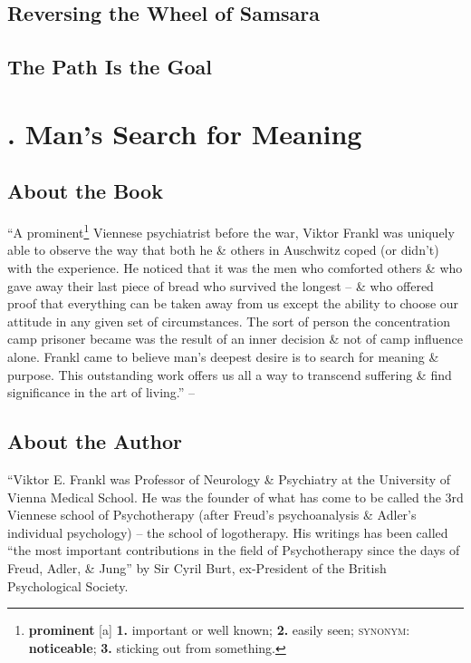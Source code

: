 \documentclass[oneside]{book}
\numberwithin{equation}{section}
\begin{document}

\section{Reversing the Wheel of Samsara}


\section{The Path Is the Goal}


\chapter{\cite{Frankl2013, Frankl2017, Frankl2022}. Man's Search for Meaning}

\section*{About the Book}
``A prominent\footnote{\textbf{prominent} [a] \textbf{1.} important or well known; \textbf{2.} easily seen; \textsc{synonym}: \textbf{noticeable}; \textbf{3.} sticking out from something.} Viennese psychiatrist before the war, Viktor Frankl was uniquely able to observe the way that both he \& others in Auschwitz coped (or didn't) with the experience. He noticed that it was the men who comforted others \& who gave away their last piece of bread who survived the longest -- \& who offered proof that everything can be taken away from us except the ability to choose our attitude in any given set of circumstances. The sort of person the concentration camp prisoner became was the result of an inner decision \& not of camp influence alone. Frankl came to believe man's deepest desire is to search for meaning \& purpose. This outstanding work offers us all a way to transcend suffering \& find significance in the art of living.'' -- \cite[About the Book, p. 3]{Frankl2013}


\section*{About the Author}
``Viktor E. Frankl was Professor of Neurology \& Psychiatry at the University of Vienna Medical School. He was the founder of what has come to be called the 3rd Viennese school of Psychotherapy (after Freud's psychoanalysis \& Adler's individual psychology) -- the school of logotherapy. His writings has been called ``the most important contributions in the field of Psychotherapy since the days of Freud, Adler, \& Jung'' by Sir Cyril Burt, ex-President of the British Psychological Society.
\end{document}
